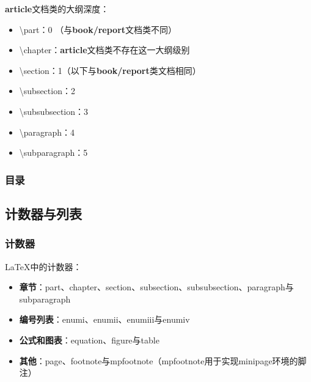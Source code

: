 \documentclass[twoside]{ctexart}
\begin{document}
            \textbf{article}文档类的大纲深度：

            \begin{itemize}
                \item \textbackslash part：0 （与\textbf{book/report}文档类不同）
                \item \textbackslash chapter：\textbf{article}文档类不存在这一大纲级别
                \item \textbackslash section：1（以下与\textbf{book/report}类文档相同）
                \item \textbackslash subsection：2
                \item \textbackslash subsubsection：3
                \item \textbackslash paragraph：4
                \item \textbackslash subparagraph：5
            \end{itemize}


        \subsubsection{目录}

    \subsection{计数器与列表}
        \subsubsection{计数器}
            \LaTeX 中的计数器：
            \begin{itemize}
                \item \textbf{章节}：part、chapter、section、subsection、subsubsection、paragraph与subparagraph
                \item \textbf{编号列表}：enumi、enumii、enumiii与enumiv
                \item \textbf{公式和图表}：equation、figure与table
                \item \textbf{其他}：page、footnote与mpfootnote（mpfootnote用于实现minipage环境的脚注）
            \end{itemize}
\end{document}
